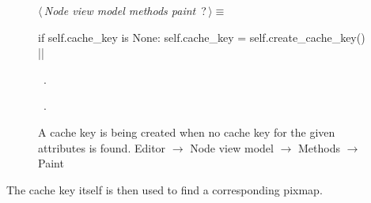 \documentclass[%
    a4paper,    %
    justified,  %
    nobib,      %
    openany     %
]{tufte-book}
\makeatletter
\renewcommand{\label}[1]{\@tufte@label{##1}}%
\makeatother
\begin{document}
\begin{figure}
\begin{flushleft} \small
\begin{minipage}{\linewidth}\label{scrap78}\raggedright\small
{} $\langle\,${\itshape Node view model methods paint}\nobreak\ {\footnotesize {?}}$\,\rangle\equiv$
\vspace{-1ex}
\begin{pythoncode}
if self.cache_key is None:
    self.cache_key = self.create_cache_key()
|\NWsep|
\end{pythoncode}
\vspace{1.5ex}
\footnotesize
\begin{list}{}{\setlength{\itemsep}{-\parsep}\setlength{\itemindent}{-\leftmargin}}
\item \NWtxtMacroDefBy\ .
\item \NWtxtMacroRefIn\ .

\item{}
\end{list}
\end{minipage}\vspace{4ex}
\end{flushleft}
\caption{A cache key is being created when no cache key for the given attributes
  is found.
  \newline{}\newline{}Editor $\rightarrow$ Node view model $\rightarrow$
  Methods $\rightarrow$ Paint}
\label{editor:lst:node-view-model:methods:paint:create-cache-key}
\end{figure}

The cache key itself is then used to find a corresponding pixmap.
\end{document}
